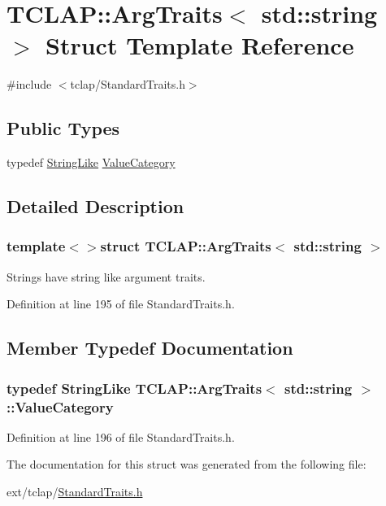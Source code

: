 \hypertarget{struct_t_c_l_a_p_1_1_arg_traits_3_01std_1_1string_01_4}{}\section{T\+C\+L\+A\+P\+:\+:Arg\+Traits$<$ std\+:\+:string $>$ Struct Template Reference}
\label{struct_t_c_l_a_p_1_1_arg_traits_3_01std_1_1string_01_4}


{\ttfamily \#include $<$tclap/\+Standard\+Traits.\+h$>$}

\subsection*{Public Types}
\begin{DoxyCompactItemize}
\item 
typedef \hyperlink{struct_t_c_l_a_p_1_1_string_like}{String\+Like} \hyperlink{struct_t_c_l_a_p_1_1_arg_traits_3_01std_1_1string_01_4_a719adeb18786516dd4b2a16525cf4536}{Value\+Category}
\end{DoxyCompactItemize}


\subsection{Detailed Description}
\subsubsection*{template$<$$>$struct T\+C\+L\+A\+P\+::\+Arg\+Traits$<$ std\+::string $>$}

Strings have string like argument traits. 

Definition at line 195 of file Standard\+Traits.\+h.



\subsection{Member Typedef Documentation}
\hypertarget{struct_t_c_l_a_p_1_1_arg_traits_3_01std_1_1string_01_4_a719adeb18786516dd4b2a16525cf4536}{}
\subsubsection[{Value\+Category}]{\setlength{\rightskip}{0pt plus 5cm}typedef {\bf String\+Like} {\bf T\+C\+L\+A\+P\+::\+Arg\+Traits}$<$ std\+::string $>$\+::{\bf Value\+Category}}\label{struct_t_c_l_a_p_1_1_arg_traits_3_01std_1_1string_01_4_a719adeb18786516dd4b2a16525cf4536}


Definition at line 196 of file Standard\+Traits.\+h.



The documentation for this struct was generated from the following file\+:\begin{DoxyCompactItemize}
\item 
ext/tclap/\hyperlink{_standard_traits_8h}{Standard\+Traits.\+h}\end{DoxyCompactItemize}
